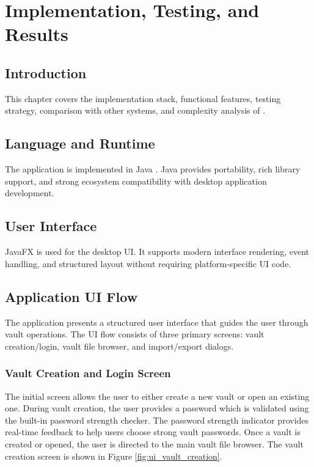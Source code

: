 \chapter{Implementation, Testing, and Results}
\section{Introduction}
This chapter covers the implementation stack, functional features, testing strategy, comparison with other systems, and complexity analysis of \projname{}.

\section{Language and Runtime}
The application is implemented in Java  \cite{oaks_java_security}. Java provides portability, rich library support, and strong ecosystem compatibility with desktop application development.

\section{User Interface}
JavaFX  \cite{javafx} is used for the desktop UI. It supports modern interface rendering, event handling, and structured layout without requiring platform-specific UI code.

\section{Application UI Flow}
The application presents a structured user interface that guides the user through vault operations. The UI flow consists of three primary screens: vault creation/login, vault file browser, and import/export dialogs.

\subsection{Vault Creation and Login Screen}
The initial screen allows the user to either create a new vault or open an existing one. During vault creation, the user provides a password which is validated using the built-in password strength checker. The password strength indicator provides real-time feedback to help users choose strong vault passwords. Once a vault is created or opened, the user is directed to the main vault file browser. The vault creation screen is shown in Figure \ref{fig:ui_vault_creation}.

